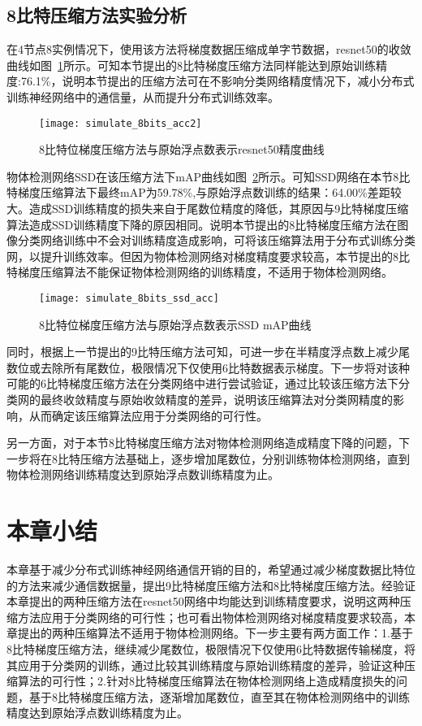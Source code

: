 \subsection{8比特压缩方法实验分析}
在4节点8实例情况下，使用该方法将梯度数据压缩成单字节数据，resnet50的收敛曲线如图~\ref{fig:simulate_8bits_acc}所示。可知本节提出的8比特梯度压缩方法同样能达到原始训练精度:76.1\%，说明本节提出的压缩方法可在不影响分类网络精度情况下，减小分布式训练神经网络中的通信量，从而提升分布式训练效率。
\begin{figure}[htp]
\centering
\texttt{[image: simulate\_8bits\_acc2]}
\caption{8比特位梯度压缩方法与原始浮点数表示resnet50精度曲线}
\label{fig:simulate_8bits_acc}
\end{figure}

物体检测网络SSD在该压缩方法下mAP曲线如图~\ref{fig:simulate_8bits_ssd_acc}所示。可知SSD网络在本节8比特梯度压缩算法下最终mAP为59.78\%,与原始浮点数训练的结果：64.00\%差距较大。造成SSD训练精度的损失来自于尾数位精度的降低，其原因与9比特梯度压缩算法造成SSD训练精度下降的原因相同。说明本节提出的8比特梯度压缩方法在图像分类网络训练中不会对训练精度造成影响，可将该压缩算法用于分布式训练分类网，以提升训练效率。但因为物体检测网络对梯度精度要求较高，本节提出的8比特梯度压缩算法不能保证物体检测网络的训练精度，不适用于物体检测网络。
\begin{figure}[htp]
\centering
\texttt{[image: simulate\_8bits\_ssd\_acc]}
\caption{8比特位梯度压缩方法与原始浮点数表示SSD mAP曲线}
\label{fig:simulate_8bits_ssd_acc}
\end{figure}

同时，根据上一节提出的9比特压缩方法可知，可进一步在半精度浮点数上减少尾数位或去除所有尾数位，极限情况下仅使用6比特数据表示梯度。下一步将对该种可能的6比特梯度压缩方法在分类网络中进行尝试验证，通过比较该压缩方法下分类网的最终收敛精度与原始收敛精度的差异，说明该压缩算法对分类网精度的影响，从而确定该压缩算法应用于分类网络的可行性。

另一方面，对于本节8比特梯度压缩方法对物体检测网络造成精度下降的问题，下一步将在8比特压缩方法基础上，逐步增加尾数位，分别训练物体检测网络，直到物体检测网络训练精度达到原始浮点数训练精度为止。
\section{本章小结}
本章基于减少分布式训练神经网络通信开销的目的，希望通过减少梯度数据比特位的方法来减少通信数据量，提出9比特梯度压缩方法和8比特梯度压缩方法。经验证本章提出的两种压缩方法在resnet50网络中均能达到训练精度要求，说明这两种压缩方法应用于分类网络的可行性；也可看出物体检测网络对梯度精度要求较高，本章提出的两种压缩算法不适用于物体检测网络。下一步主要有两方面工作：1.基于8比特梯度压缩方法，继续减少尾数位，极限情况下仅使用6比特数据传输梯度，将其应用于分类网的训练，通过比较其训练精度与原始训练精度的差异，验证这种压缩算法的可行性；2.针对8比特梯度压缩算法在物体检测网络上造成精度损失的问题，基于8比特梯度压缩方法，逐渐增加尾数位，直至其在物体检测网络中的训练精度达到原始浮点数训练精度为止。







